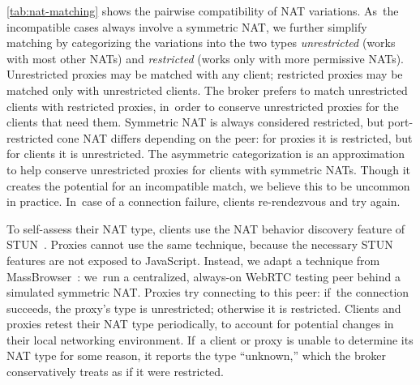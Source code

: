 \documentclass[letterpaper,twocolumn]{article}
\newcommand{\firstterm}[1]{\textit{#1}}
\begin{document}
\autoref{tab:nat-matching}
shows the pairwise compatibility of NAT variations.
As~the incompatible cases always involve a symmetric NAT,
we further simplify matching by categorizing the variations into the two types
\firstterm{unrestricted} (works with most other NATs) and
\firstterm{restricted} (works only with more permissive NATs).
Unrestricted proxies may be matched with any client;
restricted proxies may be matched only with unrestricted clients.
The broker prefers to match unrestricted clients with restricted proxies,
in~order to conserve unrestricted proxies
for the clients that need them.
Symmetric NAT is always considered restricted,
but port-restricted cone NAT differs
depending on the peer:
for proxies it is restricted, but
for clients it is unrestricted.
The asymmetric categorization is an approximation
to help conserve unrestricted proxies
for clients with symmetric NATs.
Though it creates the potential for an incompatible match,
we believe this to be uncommon in practice.
In~case of a connection failure,
clients re-rendezvous and try again.

To self-assess their NAT type,
clients use the NAT behavior discovery feature of STUN~\cite{rfc5780}.
Proxies cannot use the same technique,
because the necessary STUN features are not exposed
to JavaScript.
Instead,
we adapt a technique from MassBrowser~\cite[\S \mbox{V-A}]{Nasr2020a}:
we~run a centralized, always-on WebRTC testing peer
behind a simulated symmetric NAT.
Proxies try connecting to this peer:
if~the connection succeeds, the proxy's type is unrestricted;
otherwise it is restricted.
Clients and proxies retest their NAT type periodically,
to account for potential changes in their local networking environment.
If~a client or proxy is unable to determine its NAT type for some reason,
it reports the type ``unknown,''
which the broker conservatively treats as if it were restricted.
\end{document}
